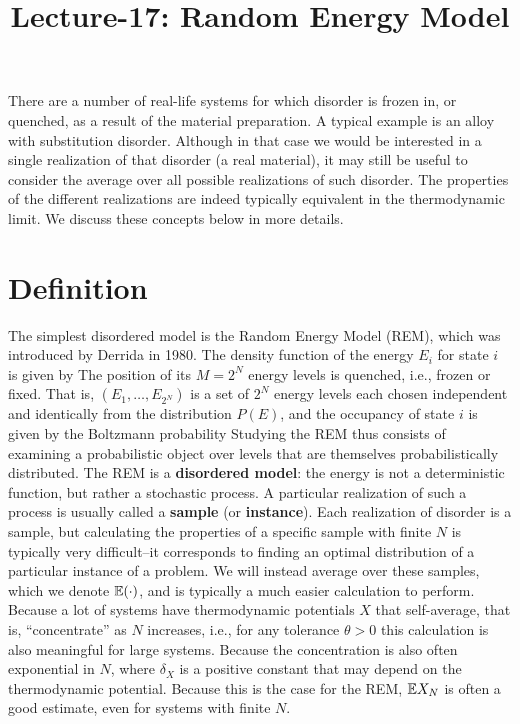 \documentclass[letterpaper,english,10pt]{article}
\title{Lecture-17: Random Energy Model}
\begin{document}
\maketitle



There are a number of real-life systems for which disorder is frozen in, or quenched, as a result of the material preparation. 
A typical example is an alloy with substitution disorder. 
Although in that case we would be interested in a single realization of that disorder (a real material), it may still be useful to consider the average over all possible realizations of such disorder. 
The properties of the different realizations are indeed typically equivalent in the thermodynamic limit. 
We discuss these concepts below in more details.

\section{Definition}
The simplest disordered model is the Random Energy Model (REM), which was introduced by Derrida in 1980. 
The density function of the energy $E_i$ for state $i$ is given by 
The position of its $M = 2^N$ energy levels is quenched, i.e., frozen or fixed. 
That is, $(E_1, \dots, E_{2^N})$ is a set of $2^N$ energy levels each chosen independent and identically from the distribution $P(E)$, 
and the occupancy of state $i$ is given by the Boltzmann probability
Studying the REM thus consists of examining a probabilistic object over levels that are themselves probabilistically distributed. 
The REM is a \textbf{disordered model}: the energy is not a deterministic function, but rather a stochastic process. 
A particular realization of such a process is usually called a \textbf{sample} (or \textbf{instance}). 
Each realization of disorder is a sample, but calculating the properties of a specific sample with finite $N$ is typically very difficult--it corresponds to finding an optimal distribution of a particular instance of a problem. We will instead average over these samples, which we denote $\mathbb{E}(\cdot)$, and is typically a much easier calculation to perform. 
Because a lot of systems have thermodynamic potentials $X$ that self-average, that is, ``concentrate'' as $N$ increases, i.e., for any tolerance $\theta > 0$
this calculation is also meaningful for large systems. Because the concentration is also often exponential in $N$, 
where $\delta_X$ is a positive constant that may depend on the thermodynamic potential. 
Because this is the case for the REM, $\mathbb{E} X_N$ is often a good estimate, 
even for systems with finite $N$. 
\end{document}
